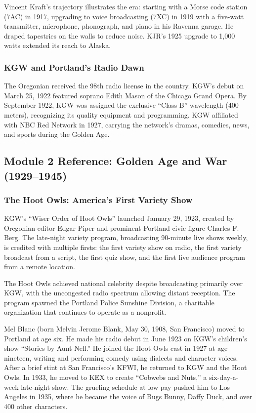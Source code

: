 \documentclass[11pt,letterpaper]{article}
\begin{document}
Vincent Kraft's trajectory illustrates the era: starting with a Morse code station (7AC) in 1917, upgrading to voice broadcasting (7XC) in 1919 with a five-watt transmitter, microphone, phonograph, and piano in his Ravenna garage. He draped tapestries on the walls to reduce noise. KJR's 1925 upgrade to 1,000 watts extended its reach to Alaska.

\subsubsection{KGW and Portland's Radio Dawn}

The Oregonian received the 98th radio license in the country. KGW's debut on March 25, 1922 featured soprano Edith Mason of the Chicago Grand Opera. By September 1922, KGW was assigned the exclusive ``Class B'' wavelength (400 meters), recognizing its quality equipment and programming. KGW affiliated with NBC Red Network in 1927, carrying the network's dramas, comedies, news, and sports during the Golden Age.

\subsection{Module 2 Reference: Golden Age and War (1929--1945)}

\subsubsection{The Hoot Owls: America's First Variety Show}

KGW's ``Wiser Order of Hoot Owls'' launched January 29, 1923, created by Oregonian editor Edgar Piper and prominent Portland civic figure Charles F. Berg. The late-night variety program, broadcasting 90-minute live shows weekly, is credited with multiple firsts: the first variety show on radio, the first variety broadcast from a script, the first quiz show, and the first live audience program from a remote location.

The Hoot Owls achieved national celebrity despite broadcasting primarily over KGW, with the uncongested radio spectrum allowing distant reception. The program spawned the Portland Police Sunshine Division, a charitable organization that continues to operate as a nonprofit.

Mel Blanc (born Melvin Jerome Blank, May 30, 1908, San Francisco) moved to Portland at age six. He made his radio debut in June 1923 on KGW's children's show ``Stories by Aunt Nell.'' He joined the Hoot Owls cast in 1927 at age nineteen, writing and performing comedy using dialects and character voices. After a brief stint at San Francisco's KFWI, he returned to KGW and the Hoot Owls. In 1933, he moved to KEX to create ``Cobwebs and Nuts,'' a six-day-a-week late-night show. The grueling schedule at low pay pushed him to Los Angeles in 1935, where he became the voice of Bugs Bunny, Daffy Duck, and over 400 other characters.
\end{document}
